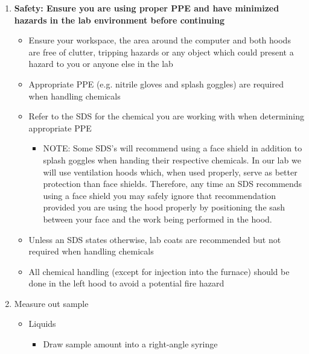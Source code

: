 \documentclass[letterpaper,11pt]{article}
\begin{document}
\begin{enumerate}
    \item \textbf{Safety: Ensure you are using proper PPE and have minimized 
        hazards in the lab environment before continuing}
            
            \begin{itemize}
            \item Ensure your workspace, the area around the computer and 
                both hoods are free of clutter, tripping hazards or any object 
                which could present a hazard to you or anyone else in the lab
            \item Appropriate PPE (e.g. nitrile gloves and splash goggles) are 
                required when handling chemicals
            \item Refer to the SDS for the chemical you are working 
                with when determining appropriate PPE
                \begin{itemize}
                \item NOTE: Some SDS's will recommend using a face shield in 
                    addition to splash goggles when handing their respective 
                    chemicals. In our lab we will use ventilation hoods which, 
                    when used properly, serve as better protection than face 
                    shields. Therefore, any time an SDS recommends using a 
                    face shield you may safely ignore that recommendation 
                    provided you are using the hood properly by positioning the 
                    sash between your face and the work being performed in 
                    the hood.
                \end{itemize}
                
            \item Unless an SDS states otherwise, lab coats are recommended but 
                not required when handling chemicals
            \item All chemical handling (except for injection into the furnace) 
                should be done in the left hood to avoid a potential fire hazard 
            \end{itemize}
    
    \item Measure out sample
        \begin{itemize}
        \item Liquids
            \begin{itemize}
            \item Draw sample amount into a right-angle syringe            
            \end{itemize}
        

\end{itemize}
\end{enumerate}
\end{document}
